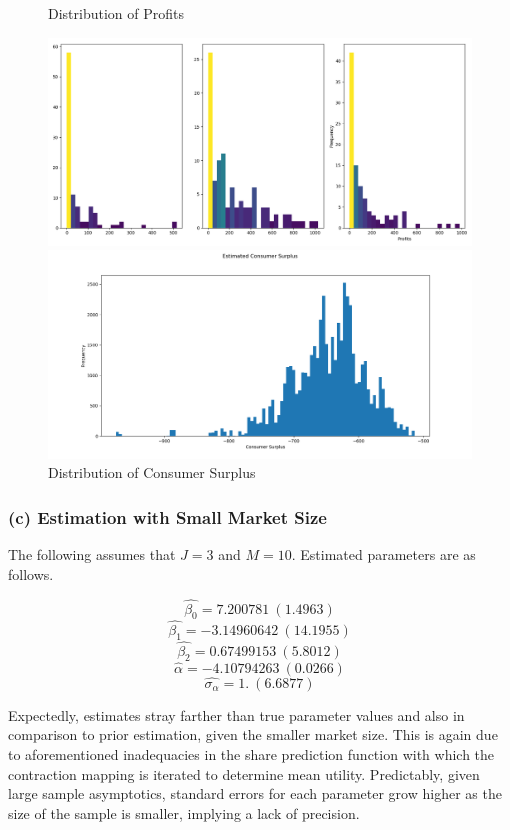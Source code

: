 \documentclass{article}
\begin{document}
\begin{figure}[h]
  \caption{Distribution of Profits}
  \centering
    \includegraphics[width=1.0\textwidth]{fig_hist_profitsW3_e}
  \caption{Distribution of Consumer Surplus}
  \centering
    \includegraphics[width=1.0\textwidth]{fig_hist_consumersurplusW3_e}
\end{figure}
\FloatBarrier

\subsubsection{(c) Estimation with Small Market Size}

The following assumes that $J=3$ and $M=10$. Estimated parameters are as follows.

$$\hat{\beta_0}=7.200781\:(1.4963)$$
$$\hat{\beta_1}=-3.14960642\:(14.1955)$$
$$\hat{\beta_2}=0.67499153\:(5.8012)$$
$$\hat{\alpha}=-4.10794263\:(0.0266)$$
$$\hat{\sigma_{\alpha}}=1.\:(6.6877)$$

Expectedly, estimates stray farther than true parameter values and also in comparison to prior estimation, given the smaller market size. This is again due to aforementioned inadequacies in the share prediction function with which the contraction mapping is iterated to determine mean utility. Predictably, given large sample asymptotics, standard errors for each parameter grow higher as the size of the sample is smaller, implying a lack of precision.
\end{document}
